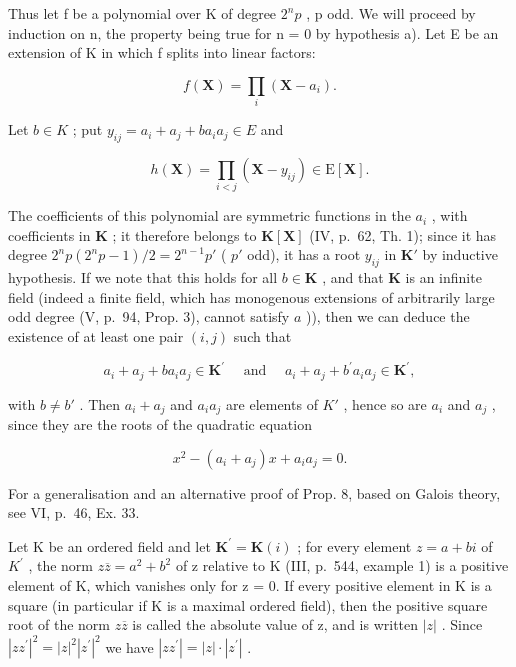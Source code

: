 Thus let f be a polynomial over K of degree \(2^{n}p\) , p odd. We will proceed by induction on n, the property being true for n = 0 by hypothesis a). Let E be an extension of K in which f splits into linear factors:

\[
f (\mathbf {X}) = \prod_ {i} \left(\mathbf {X} - a _ {i}\right).
\]

Let \(b \in K\) ; put \(y_{ij} = a_i + a_j + ba_i a_j \in E\) and

\[
h (\mathbf {X}) = \prod_ {i <   j} \left(\mathbf {X} - y _ {i j}\right) \in \mathrm{E} [ \mathbf {X} ].
\]

The coefficients of this polynomial are symmetric functions in the \(a_i\) , with coefficients in \(\mathbf{K}\) ; it therefore belongs to \(\mathbf{K}[\mathbf{X}]\) (IV, p.~62, Th. 1); since it has degree \(2^n p(2^n p - 1)/2 = 2^{n-1}p'\) ( \(p'\) odd), it has a root \(y_{ij}\) in \(\mathbf{K}'\) by inductive hypothesis. If we note that this holds for all \(b \in \mathbf{K}\) , and that \(\mathbf{K}\) is an infinite field (indeed a finite field, which has monogenous extensions of arbitrarily large odd degree (V, p.~94, Prop. 3), cannot satisfy \(a\) )), then we can deduce the existence of at least one pair \((i,j)\) such that

\[
a _ {i} + a _ {j} + b a _ {i} a _ {j} \in \mathbf {K} ^ {\prime} \quad \text { and } \quad a _ {i} + a _ {j} + b ^ {\prime} a _ {i} a _ {j} \in \mathbf {K} ^ {\prime},
\]

with \(b \neq b'\) . Then \(a_i + a_j\) and \(a_i a_j\) are elements of \(K'\) , hence so are \(a_i\) and \(a_j\) , since they are the roots of the quadratic equation

\[
x ^ {2} - \left(a _ {i} + a _ {j}\right) x + a _ {i} a _ {j} = 0.\tag{Q.E.D.}
\]

For a generalisation and an alternative proof of Prop. 8, based on Galois theory, see VI, p.~46, Ex. 33.

Let K be an ordered field and let \(\mathbf{K}^{\prime} = \mathbf{K}(i)\) ; for every element \(z = a + bi\) of \(K^{\prime}\) , the norm \(z\overline{z} = a^{2} + b^{2}\) of z relative to K (III, p.~544, example 1) is a positive element of K, which vanishes only for z = 0. If every positive element in K is a square (in particular if K is a maximal ordered field), then the positive square root of the norm \(z\overline{z}\) is called the absolute value of z, and is written \(|z|\) . Since \(|zz^{\prime}|^{2} = |z|^{2} |z^{\prime}|^{2}\) we have \(|zz^{\prime}| = |z| \cdot |z^{\prime}|\) .

